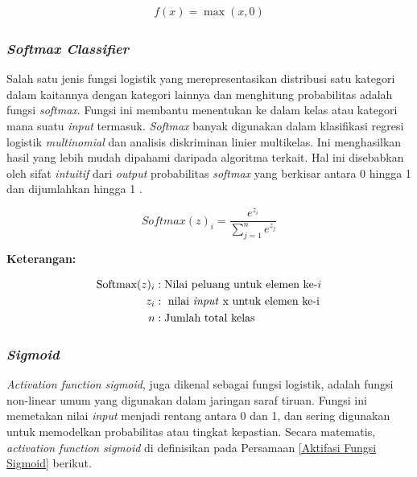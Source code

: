     \begin{equation}
        \begin{aligned}
            f(x) = \max(x, 0)
        \end{aligned}\label{Aktifasi Fungsi ReLU}
    \end{equation}



\subsubsection{\textit{Softmax Classifier}}

    Salah satu jenis fungsi logistik yang merepresentasikan distribusi satu kategori dalam kaitannya dengan kategori lainnya dan menghitung probabilitas adalah fungsi \textit{softmax}. Fungsi ini membantu menentukan ke dalam kelas atau kategori mana suatu \textit{input} termasuk. \textit{Softmax} banyak digunakan dalam klasifikasi regresi logistik \textit{multinomial} dan analisis diskriminan linier multikelas. Ini menghasilkan hasil yang lebih mudah dipahami daripada algoritma terkait. Hal ini disebabkan oleh sifat \textit{intuitif} dari \textit{output} probabilitas \textit{softmax }yang berkisar antara 0 hingga 1 dan dijumlahkan hingga 1 \cite{Zhang2019}.

        \begin{equation}
            Softmax(z)_i= \frac{e^{z_i}}{\sum_{j=1}^{n} e^{z_j}}
        \end{equation}

     \textbf{Keterangan:}
        

        \begin{align*}
            \text{Softmax}(z)_i &: \text{Nilai peluang untuk elemen ke-}i \\
            z_i &: \text{ nilai \textit{input} x untuk elemen ke-i} \\
            n &: \text{Jumlah total kelas}
        \end{align*}
        



\subsubsection{\textit{Sigmoid}}
    \textit{Activation function} \textit{sigmoid}, juga dikenal sebagai fungsi logistik, adalah fungsi non-linear umum yang digunakan dalam jaringan saraf tiruan. Fungsi ini memetakan nilai \textit{input} menjadi rentang antara 0 dan 1, dan sering digunakan untuk memodelkan probabilitas atau tingkat kepastian. Secara matematis, \textit{activation function} \textit{sigmoid} di definisikan pada Persamaan  \ref{Aktifasi Fungsi Sigmoid} berikut.

